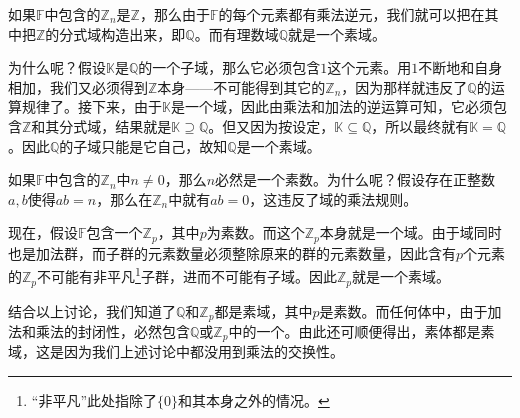 如果$\mathbb{F}$中包含的$\mathbb{Z}_n$是$\mathbb{Z}$，那么由于$\mathbb{F}$的每个元素都有乘法逆元，我们就可以把在其中把$\mathbb{Z}$的分式域构造出来，即$\mathbb{Q}$。而有理数域$\mathbb{Q}$就是一个素域。

为什么呢？假设$\mathbb{K}$是$\mathbb{Q}$的一个子域，那么它必须包含$1$这个元素。用$1$不断地和自身相加，我们又必须得到$\mathbb{Z}$本身——不可能得到其它的$\mathbb{Z}_n$，因为那样就违反了$\mathbb{Q}$的运算规律了。接下来，由于$\mathbb{K}$是一个域，因此由乘法和加法的逆运算可知，它必须包含$\mathbb{Z}$和其分式域，结果就是$\mathbb{K}\supseteq\mathbb{Q}$。但又因为按设定，$\mathbb{K}\subseteq\mathbb{Q}$，所以最终就有$\mathbb{K}=\mathbb{Q}$。因此$\mathbb{Q}$的子域只能是它自己，故知$\mathbb{Q}$是一个素域。

如果$\mathbb{F}$中包含的$\mathbb{Z}_n$中$n\neq 0$，那么$n$必然是一个素数。为什么呢？假设存在正整数$a, b$使得$ab=n$，那么在$\mathbb{Z}_n$中就有$ab=0$，这违反了域的乘法规则。

现在，假设$\mathbb{F}$包含一个$\mathbb{Z}_p$，其中$p$为素数。而这个$\mathbb{Z}_p$本身就是一个域。由于域同时也是加法群，而子群的元素数量必须整除原来的群的元素数量，因此含有$p$个元素的$\mathbb{Z}_p$不可能有非平凡\footnote{“非平凡”此处指除了$\{0\}$和其本身之外的情况。}子群，进而不可能有子域。因此$\mathbb{Z}_p$就是一个素域。

结合以上讨论，我们知道了$\mathbb{Q}$和$\mathbb{Z}_p$都是素域，其中$p$是素数。而任何体中，由于加法和乘法的封闭性，必然包含$\mathbb{Q}$或$\mathbb{Z}_p$中的一个。由此还可顺便得出，素体都是素域，这是因为我们上述讨论中都没用到乘法的交换性。












